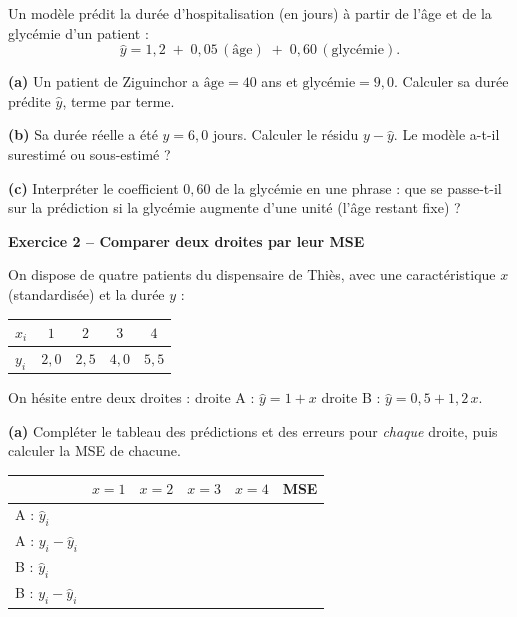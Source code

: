 \documentclass[10pt,a4paper]{article}
\newcommand{\repligne}{\par\vspace{0.42cm}\noindent\dotfill}
\newcommand{\zonecalcul}[1]{\par\vspace{0.15cm}\noindent{\small\emph{Espace de calcul :}}\par\vspace{#1}}
\begin{document}
\vspace{0.15cm}

Un modèle prédit la durée d'hospitalisation (en jours) à partir de l'âge et de la glycémie d'un patient :
$$\hat y = 1{,}2 \;+\; 0{,}05\,(\text{âge}) \;+\; 0{,}60\,(\text{glycémie}).$$

\textbf{(a)} Un patient de Ziguinchor a $\text{âge} = 40$ ans et $\text{glycémie} = 9{,}0$. Calculer sa durée prédite $\hat y$, terme par terme.
\zonecalcul{1.6cm}

\textbf{(b)} Sa durée réelle a été $y = 6{,}0$ jours. Calculer le résidu $y - \hat y$. Le modèle a-t-il surestimé ou sous-estimé ?
\repligne
\repligne

\textbf{(c)} Interpréter le coefficient $0{,}60$ de la glycémie en une phrase : que se passe-t-il sur la prédiction si la glycémie augmente d'une unité (l'âge restant fixe) ?
\repligne
\repligne

\vspace{0.2cm}
\textbf{\large Exercice 2 -- Comparer deux droites par leur MSE}

\vspace{0.15cm}

On dispose de quatre patients du dispensaire de Thiès, avec une caractéristique $x$ (standardisée) et la durée $y$ :

\vspace{0.1cm}
{\small
\renewcommand{\arraystretch}{1.5}
\begin{tabular}{|l|c|c|c|c|}
\hline
$x_i$ & $1$ & $2$ & $3$ & $4$\\
\hline
$y_i$ & $2{,}0$ & $2{,}5$ & $4{,}0$ & $5{,}5$\\
\hline
\end{tabular}}

\vspace{0.2cm}
On hésite entre deux droites : \quad droite A : $\hat y = 1 + x$ \qquad droite B : $\hat y = 0{,}5 + 1{,}2\,x$.

\vspace{0.2cm}
\textbf{(a)} Compléter le tableau des prédictions et des erreurs pour \emph{chaque} droite, puis calculer la MSE de chacune.

\vspace{0.1cm}
{\small
\renewcommand{\arraystretch}{1.8}
\begin{tabular}{|l|c|c|c|c||c|}
\hline
 & $x=1$ & $x=2$ & $x=3$ & $x=4$ & \textbf{MSE}\\
\hline
A : $\hat y_i$ & & & & & \\
\hline
A : $y_i - \hat y_i$ & & & & & \\
\hline
B : $\hat y_i$ & & & & & \\
\hline
B : $y_i - \hat y_i$ & & & & & \\
\hline
\end{tabular}}
\end{document}
